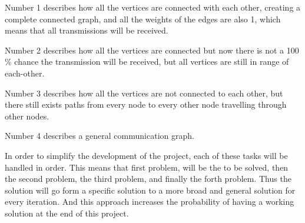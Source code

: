 Number 1 describes how all the vertices are connected with each other, creating a complete connected graph, and all the weights of the edges are also 1, which means that all transmissions will be received.

Number 2 describes how all the vertices are connected but now there is not a 100 \% chance the transmission will be received, but all vertices are still in range of each-other.

Number 3 describes how all the vertices are not connected to each other, but there still exists paths from every node to every other node travelling through other nodes.

Number 4 describes a general communication graph.

\bigskip \noindent
In order to simplify the development of the project, each of these tasks will be handled in order.
This means that first problem, will be the to be solved, then the second problem, the third problem, and finally the forth problem.
Thus the solution will go form a specific solution to a more broad and general solution for every iteration.
And this approach increases the probability of having a working solution at the end of this project.

